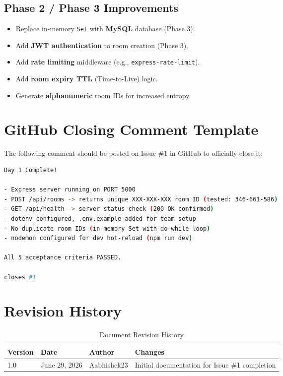 \documentclass[11pt,a4paper]{article}
\begin{document}
\subsection{Phase 2 / Phase 3 Improvements}

\begin{itemize}
    \item Replace in-memory \texttt{Set} with \textbf{MySQL} database (Phase 3).
    \item Add \textbf{JWT authentication} to room creation (Phase 3).
    \item Add \textbf{rate limiting} middleware (e.g., \texttt{express-rate-limit}).
    \item Add \textbf{room expiry TTL} (Time-to-Live) logic.
    \item Generate \textbf{alphanumeric} room IDs for increased entropy.
\end{itemize}

\section{GitHub Closing Comment Template}

The following comment should be posted on Issue \#1 in GitHub to officially close it:

\begin{lstlisting}[language=bash, caption={GitHub Closing Comment for Issue \#1}]
 Day 1 Complete!

- Express server running on PORT 5000
- POST /api/rooms -> returns unique XXX-XXX-XXX room ID (tested: 346-661-586)
- GET /api/health -> server status check (200 OK confirmed)
- dotenv configured, .env.example added for team setup
- No duplicate room IDs (in-memory Set with do-while loop)
- nodemon configured for dev hot-reload (npm run dev)

All 5 acceptance criteria PASSED.

closes #1
\end{lstlisting}

\section{Revision History}

\begin{table}[h!]
\centering
\begin{tabular}{@{}llll@{}}
\toprule
\textbf{Version} & \textbf{Date} & \textbf{Author} & \textbf{Changes} \\ \midrule
1.0 & June 29, 2026 & Aabhishek23 & Initial documentation for Issue \#1 completion \\ \bottomrule
\end{tabular}
\caption{Document Revision History}
\label{tab:revisions}
\end{table}
\end{document}
